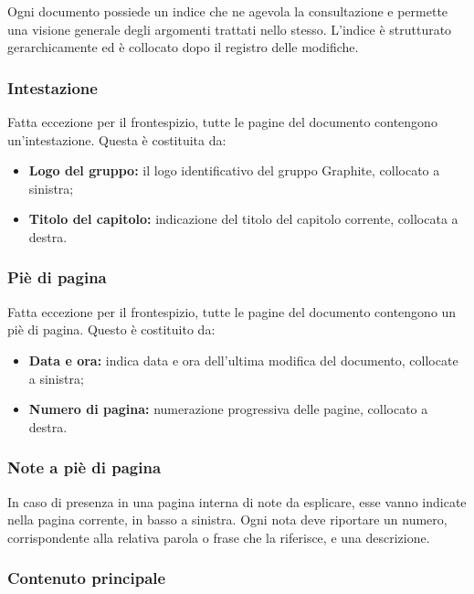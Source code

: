 \documentclass[../NormediProgetto.tex]{subfiles}
\begin{document}
Ogni documento possiede un indice che ne agevola la consultazione e permette una visione generale degli argomenti trattati nello stesso. L'indice è strutturato gerarchicamente ed è collocato dopo il registro delle modifiche.

\subsubsection{Intestazione}

Fatta eccezione per il frontespizio, tutte le pagine del documento contengono un’intestazione. Questa è costituita da: 

\begin{itemize}
    \item \textbf{Logo del gruppo:} il logo identificativo del gruppo Graphite, collocato a sinistra;
    \item \textbf{Titolo del capitolo:} indicazione del titolo del capitolo corrente, collocata a destra.
\end{itemize}

\subsubsection{Piè di pagina}

Fatta eccezione per il frontespizio, tutte le pagine del documento contengono un piè di pagina. Questo è costituito da: 

\begin{itemize}
    \item \textbf{Data e ora:} indica data e ora dell'ultima modifica del documento, collocate a sinistra;
    \item \textbf{Numero di pagina:} numerazione progressiva delle pagine, collocato a destra.
\end{itemize}

\subsubsection{Note a piè di pagina}

In caso di presenza in una pagina interna di note da esplicare, esse vanno indicate nella pagina corrente, in basso a sinistra. Ogni nota deve riportare un numero, corrispondente alla relativa parola o frase che la riferisce, e una descrizione.

\subsubsection{Contenuto principale}
\end{document}
